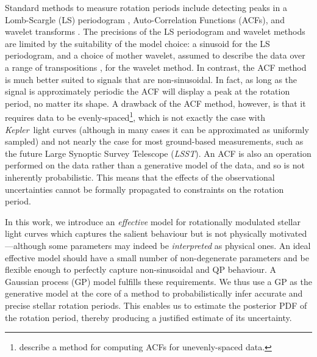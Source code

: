 \documentclass[useAMS, usenatbib, preprint, 12pt]{aastex}
\newcommand{\Kepler}{{\it Kepler}}
\newcommand{\LSST}{{\it LSST}}
\newcommand{\eg}{{\it e.g.}}
\begin{document}
Standard methods to measure rotation periods include detecting
peaks in a Lomb-Scargle \citep{Lomb1976, Scargle1982} (LS) periodogram
\citep[\eg][]{Reinhold2013}, Auto-Correlation Functions (ACFs),
\citep[\eg][]{Mcquillan13b} and wavelet transforms \citep[\eg][]{Garcia2014}.
The precisions of the LS periodogram and wavelet methods are limited by the
suitability of the model choice: a sinusoid for the LS periodogram,
and a choice of mother wavelet, assumed to describe the data
over a range of transpositions \citep[see, \eg][]{Carter2010},
for the wavelet method.
In contrast, the ACF method is much better suited to signals that are
non-sinusoidal.
In fact, as long as the signal is approximately periodic the ACF will
display a peak at the rotation period, no matter its shape.
A drawback of the ACF method, however, is that it requires data to be
evenly-spaced\footnote{\citet{Edelson1988} describe a method for computing
ACFs for unevenly-spaced data.}, which is not exactly the case with \Kepler\
light curves (although in many cases it can be approximated as uniformly
sampled) and not nearly the case for most ground-based measurements, such
as the future Large Synoptic Survey Telescope (\LSST).
An ACF is also an operation performed on the data rather than a generative
model of the data, and so is not inherently probabilistic.
This means that the effects of the observational uncertainties cannot be
formally propagated to constraints on the rotation period.

In this work, we introduce an {\it effective} model for rotationally
modulated stellar light curves
which captures the salient behaviour but is not
physically motivated---although some parameters may indeed be
{\it interpreted} as physical ones.
An ideal effective model should have a small number of non-degenerate parameters
and be flexible enough to perfectly capture non-sinusoidal and QP behaviour.
A Gaussian process (GP) model fulfills these requirements. We thus use a GP
as the generative model at the core of a method to probabilistically
infer accurate and precise stellar rotation periods.  This enables us to
estimate the posterior PDF of the rotation period, thereby producing a
justified estimate of its uncertainty.
\end{document}
